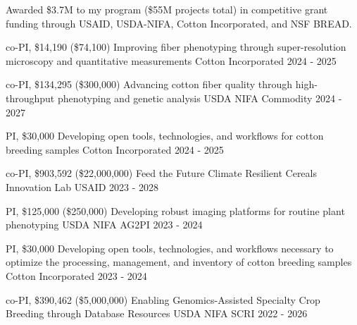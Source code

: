 
  \cvsummarytext
    {Awarded \$3.7M to my program (\$55M projects total) in competitive grant funding through USAID, USDA-NIFA, Cotton Incorporated, and NSF BREAD.}

\begin{cvgrants}

  \cvgrant
    {co-PI, \$14,190 (\$74,100)}
    {Improving fiber phenotyping through super-resolution microscopy and quantitative measurements}
    {Cotton Incorporated} %
    {2024 - 2025}
    {
    }
  
  \cvgrant
    {co-PI, \$134,295 (\$300,000)}
    {Advancing cotton fiber quality through high-throughput phenotyping and genetic analysis}
    {USDA NIFA Commodity} %
    {2024 - 2027}
    {
    }

  \cvgrant
    {PI, \$30,000}
    {Developing open tools, technologies, and workflows for cotton breeding samples}
    {Cotton Incorporated} %
    {2024 - 2025}
    {
    }

  \cvgrant
    {co-PI, \$903,592 (\$22,000,000)}
    {Feed the Future Climate Resilient Cereals Innovation Lab}
    {USAID} %
    {2023 - 2028}
    {
    }

  \cvgrant
    {PI, \$125,000 (\$250,000)}
    {Developing robust imaging platforms for routine plant phenotyping}
    {USDA NIFA AG2PI} %
    {2023 - 2024}
    {
    }

  \cvgrant
    {PI, \$30,000}
    {Developing open tools, technologies, and workflows necessary to optimize the processing, management, and inventory of cotton breeding samples}
    {Cotton Incorporated} %
    {2023 - 2024}
    {
    }

  \cvgrant
    {co-PI, \$390,462 (\$5,000,000)}
    {Enabling Genomics-Assisted Specialty Crop Breeding through Database Resources}
    {USDA NIFA SCRI} %
    {2022 - 2026}
    {
    }


\end{cvgrants}
